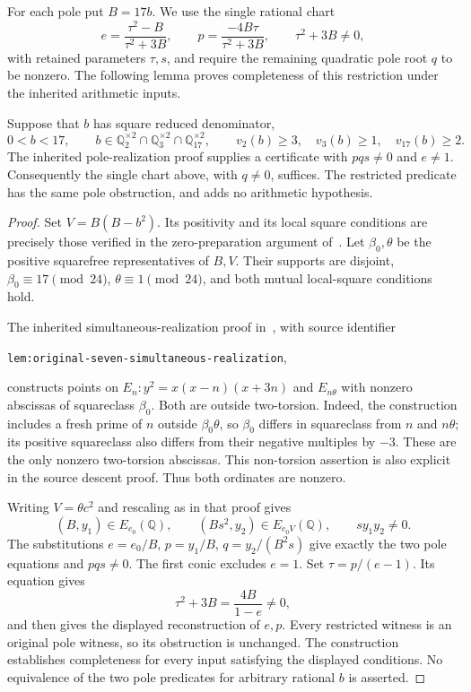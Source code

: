 \documentclass[11pt,a4paper]{article}
\newcommand{\Q}{\mathbb Q}\newcommand{\Z}{\mathbb Z}
\begin{document}
For each pole put $B=17b$. We use the single rational chart
\[
 e=\frac{\tau^2-B}{\tau^2+3B},\qquad
 p=\frac{-4B\tau}{\tau^2+3B},\qquad
 \tau^2+3B\ne0,
\]
with retained parameters $\tau,s$, and require the remaining quadratic
pole root $q$ to be nonzero. The following lemma proves completeness
of this restriction under the inherited arithmetic inputs.

\begin{lemma}\label{lem:pole-chart}
Suppose that $b$ has square reduced denominator,
\[
 0<b<17,\qquad b\in\Q_2^{\times2}\cap\Q_3^{\times2}
 \cap\Q_{17}^{\times2},\qquad
 v_2(b)\ge3,\quad v_3(b)\ge1,\quad v_{17}(b)\ge2.
\]
The inherited pole-realization proof supplies a certificate with
$pqs\ne0$ and $e\ne1$. Consequently the single chart above,
with $q\ne0$, suffices. The restricted predicate has the same
pole obstruction, and adds no arithmetic hypothesis.
\end{lemma}
\begin{proof}
Set $V=B(B-b^2)$. Its positivity and its local square conditions
are precisely those verified in the zero-preparation argument
of~\cite{Dependencies}. Let $\beta_0,\theta$ be the positive
squarefree representatives of $B,V$. Their supports are disjoint,
$\beta_0\equiv17\pmod{24}$, $\theta\equiv1\pmod{24}$, and
both mutual local-square conditions hold.

The inherited simultaneous-realization proof in~\cite{Glazer},
with source identifier
\begin{center}\small
\texttt{lem:original-seven-simultaneous-realization},
\end{center}
constructs points on $E_n:y^2=x(x-n)(x+3n)$ and $E_{n\theta}$ with nonzero
abscissas of squareclass $\beta_0$. Both are outside two-torsion.
Indeed, the construction includes a fresh prime of $n$ outside
$\beta_0\theta$, so $\beta_0$ differs in squareclass from $n$
and $n\theta$; its positive squareclass also differs from their
negative multiples by $-3$. These are the only nonzero two-torsion
abscissas. This non-torsion assertion is also explicit in the
source descent proof. Thus both ordinates are nonzero.

Writing $V=\theta c^2$ and rescaling as in that proof gives
\[
       (B,y_1)\in E_{e_0}(\Q),\qquad
       (Bs^2,y_2)\in E_{e_0V}(\Q),\qquad sy_1y_2\ne0.
\]
The substitutions $e=e_0/B$, $p=y_1/B$, $q=y_2/(B^2s)$
give exactly the two pole equations and $pqs\ne0$. The first
conic excludes $e=1$. Set $\tau=p/(e-1)$. Its equation gives
\[
       \tau^2+3B=\frac{4B}{1-e}\ne0,
\]
and then gives the displayed reconstruction of $e,p$.
Every restricted witness is an original pole witness, so its
obstruction is unchanged. The construction establishes completeness
for every input satisfying the displayed conditions. No equivalence
of the two pole predicates for arbitrary rational $b$ is asserted.
\end{proof}
\end{document}
